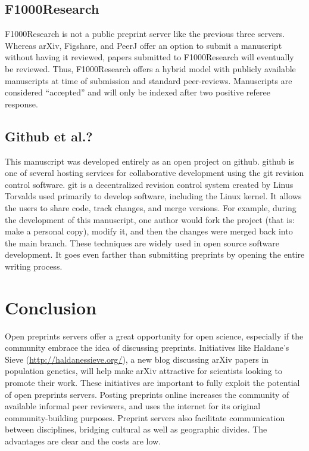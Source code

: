 \documentclass[letterpaper,twocolumn,superscriptaddress,showkeys]{revtex4-1}
\begin{document}
\subsection{F1000Research}

F1000Research is not a public preprint server like the previous three servers.
Whereas arXiv, Figshare, and PeerJ offer an option to submit a manuscript
without having it reviewed, papers submitted to F1000Research will eventually be
reviewed. Thus, F1000Research offers a hybrid model with publicly available
manuscripts at time of submission and standard peer-reviews. Manuscripts are
considered ``accepted'' and will only be indexed after two positive referee
response.

\subsection{Github et al.?}

This manuscript was developed entirely as an open project on
github. github is one of several hosting services for collaborative
development using the git revision control software.  git is a
decentralized revision control system created by Linus Torvalds used
primarily to develop software, including the Linux kernel. It allows
the users to share code, track changes, and merge versions. For
example, during the development of this manuscript, one author would
fork the project (that is: make a personal copy), modify it, and then
the changes were merged back into the main branch. These techniques
are widely used in open source software development. It goes even
farther than submitting preprints by opening the entire writing
process.

\section{Conclusion}

Open preprints servers offer a great opportunity for open science, especially if
the community embrace the idea of discussing preprints. Initiatives like
Haldane's Sieve (\href{http://haldanessieve.org/}{http://haldanessieve.org/}), a
new blog discussing arXiv papers in population genetics, will help make arXiv
attractive for scientists looking to promote their work. These initiatives are
important to fully exploit the potential of open preprints servers. Posting
preprints online increases the community of available informal peer reviewers,
and uses the internet for its original community-building purposes.  Preprint
servers also facilitate communication between disciplines, bridging cultural as
well as geographic divides. The advantages are clear and the costs are low.
\end{document}
